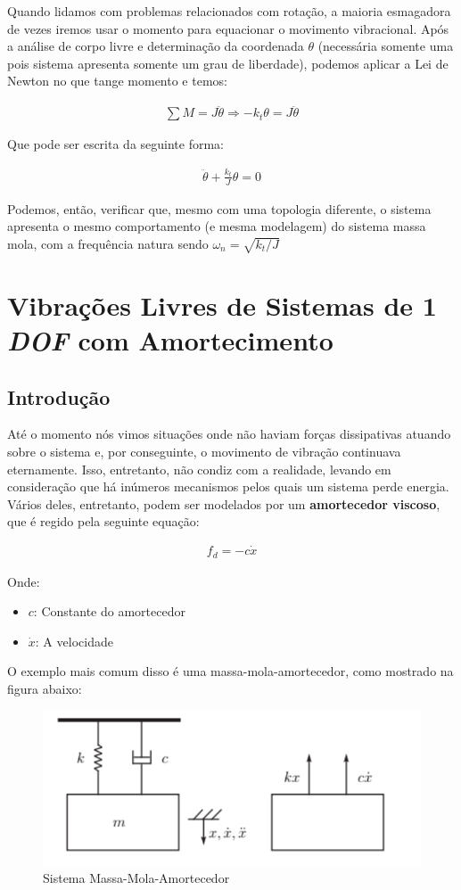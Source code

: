 \documentclass{article}
\begin{document}
Quando lidamos com problemas relacionados com rotação, a maioria esmagadora de vezes iremos usar o momento para equacionar o movimento vibracional. Após a análise de corpo livre e
determinação da coordenada $\theta$ (necessária somente uma pois sistema apresenta somente um grau de liberdade), podemos aplicar a Lei de Newton no que tange momento e temos:

\begin{align*}
    \sum M = J \ddot \theta \Rightarrow -k_t\theta = J \ddot \theta
\end{align*}

Que pode ser escrita da seguinte forma:

\begin{align}
    \ddot\theta + \frac{k_t}{J}\theta = 0 \label{eq:som_moments_sis_torcional}
\end{align}

Podemos, então, verificar que, mesmo com uma topologia diferente, o sistema apresenta o mesmo comportamento (e mesma modelagem) do sistema massa mola, com a frequência natura sendo
$\omega_n = \sqrt{k_t/J}$

\section{Vibrações Livres de Sistemas de 1 \emph{DOF} com Amortecimento}

\subsection{Introdução}
Até o momento nós vimos situações onde não haviam forças dissipativas atuando sobre o sistema e, por conseguinte, o movimento de vibração continuava eternamente. Isso, entretanto, não
condiz com a realidade, levando em consideração que há inúmeros mecanismos pelos quais um sistema perde energia. Vários deles, entretanto, podem ser modelados por um
\textbf{amortecedor viscoso}, que é regido pela seguinte equação:

\begin{align}
    f_d = -c \dot x \label{eq:forca_amortecedor_viscoso}
\end{align}

Onde:
\begin{itemize}
    \item $c$: Constante do amortecedor
    \item $\dot x$: A velocidade
\end{itemize}

O exemplo mais comum disso é uma massa-mola-amortecedor, como mostrado na figura abaixo:
\begin{figure}[h]
    \centering
    \includegraphics[width=.4\textwidth]{imgs/sis_massa_mola_amortecedor.png}
    \caption{Sistema Massa-Mola-Amortecedor}
\end{figure}
\end{document}
